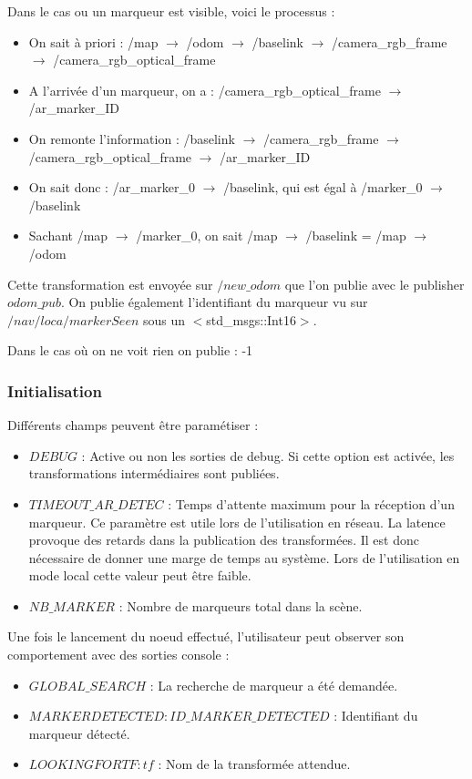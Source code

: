 \documentclass[10pt,a4paper]{article}
\begin{document}
\noindent Dans le cas ou un marqueur est visible, voici le processus : 
\begin{itemize}
\item On sait à priori : /map $\rightarrow$ /odom $\rightarrow$ /baselink $\rightarrow$ /camera\_rgb\_frame $\rightarrow$ /camera\_rgb\_optical\_frame 
\item A l'arrivée d'un marqueur, on a : /camera\_rgb\_optical\_frame $\rightarrow$ /ar\_marker\_ID 
\item On remonte l'information : /baselink $\rightarrow$ /camera\_rgb\_frame $\rightarrow$ /camera\_rgb\_optical\_frame $\rightarrow$ /ar\_marker\_ID
\item On sait donc : /ar\_marker\_0 $\rightarrow$ /baselink, qui est égal à /marker\_0 $\rightarrow$ /baselink 
\item Sachant /map $\rightarrow$ /marker\_0, on sait /map $\rightarrow$ /baselink = /map  $\rightarrow$ /odom 
\end{itemize}

Cette transformation est envoyée sur $/new\_odom$ que l'on publie avec le publisher $odom\_pub$. On publie également l'identifiant du marqueur vu sur $/nav/loca/markerSeen$ sous un $<$std\_msgs::Int16$>$. 

\noindent Dans le cas où on ne voit rien on publie : -1 

\subsubsection*{Initialisation}
\noindent Différents champs peuvent être paramétiser : 
\begin{itemize}
\item $DEBUG$ : Active ou non les sorties de debug. Si cette option est activée, les transformations intermédiaires sont publiées.
\item $TIMEOUT\_AR\_DETEC$ : Temps d'attente maximum pour la réception d'un marqueur. Ce paramètre est utile lors de l'utilisation en réseau. La latence provoque des retards dans la publication des transformées. Il est donc nécessaire de donner une marge de temps au système. Lors de l'utilisation en mode local cette valeur peut \^etre faible.
\item $NB\_MARKER$ : Nombre de marqueurs total dans la scène.
\end{itemize}

Une fois le lancement du noeud effectué, l'utilisateur peut observer son comportement avec des sorties console :
\begin{itemize}
\item $GLOBAL\_SEARCH$ : La recherche de marqueur a été demandée.
\item $ MARKER DETECTED: ID\_MARKER\_DETECTED$ : Identifiant du marqueur détecté.
\item $LOOKING FOR TF: tf$ : Nom de la transformée attendue.
\end{itemize}
\end{document}
